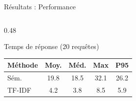 \documentclass[aspectratio=169, 10pt]{beamer}
\begin{document}
\begin{frame}{R\'{e}sultats : Performance}
  \begin{columns}[T]
    \begin{column}{0.48\textwidth}
      \begin{block}{Temps de r\'{e}ponse (20 requ\^{e}tes)}
        \centering
        \begin{tabular}{@{}lcccc@{}}
          \toprule
          \textbf{M\'{e}thode} & \textbf{Moy.} & \textbf{M\'{e}d.} & \textbf{Max} & \textbf{P95} \\
          \midrule
          S\'{e}m.  & 19.8 & 18.5 & 32.1 & 26.2 \\
          TF-IDF & 4.2  & 3.8  & 8.5  & 5.9 \\
          \bottomrule
        \end{tabular}
        \vspace{0.3em}


\end{block}
\end{column}
\end{columns}
\end{frame}
\end{document}

